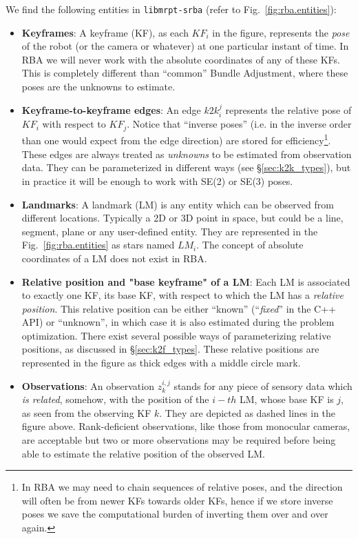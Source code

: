 \documentclass[a4paper,11pt]{article}
\begin{document}
We find the following entities in \texttt{libmrpt-srba} (refer to Fig.~\ref{fig:rba.entities}):

\begin{itemize}
\item{\textbf{Keyframes}: A keyframe (KF), as each $KF_i$ in the figure, represents the \emph{pose} of the robot (or the 
camera or whatever) at one  particular instant of time. In RBA we will never work with the absolute coordinates of any of 
these KFs. This is completely different than ``common'' Bundle Adjustment, where these poses are the unknowns to 
estimate.
}
\item{\textbf{Keyframe-to-keyframe edges}: An edge $k2k_i^j$ represents the relative pose of $KF_i$ with respect to 
$KF_j$. Notice that ``inverse poses'' (i.e. in the inverse order than one would expect from the edge direction) are 
stored for efficiency\footnote{In RBA we may need to chain sequences of relative poses, and the direction will often 
be from newer KFs towards older KFs, hence if we store inverse poses we save the computational burden of inverting them 
over and over again.}. These edges are always treated as \emph{unknowns} to be estimated from observation data.
They can be parameterized in different ways (see \S\ref{sec:k2k_types}), but in practice it will be enough to work 
with SE(2) or SE(3) poses.
}
\item{\textbf{Landmarks}: A landmark (LM) is any entity which can be observed from different locations. Typically a 2D 
or 3D point in space, but could be a line, segment, plane or any user-defined entity. They are represented in 
the Fig.~\ref{fig:rba.entities} as stars named $LM_i$. The concept of absolute coordinates of a LM 
does not exist in RBA.
}
\item{\textbf{Relative position and "base keyframe" of a LM}: Each LM is associated to exactly one KF, its {base KF}, with 
respect to which the LM has a \emph{relative position}. This relative position can be either ``known'' (``\emph{fixed}'' 
in the C++ API) or ``unknown'', in which case it is also estimated during the problem optimization. There exist several 
possible ways of parameterizing relative positions, as discussed in \S\ref{sec:k2f_types}. These relative positions are 
represented in the figure as thick edges with a middle circle mark.
}
\item{\textbf{Observations}: An observation $z^{i,j}_k$ stands for any piece of sensory data which \emph{is related}, 
somehow, with the position of the $i-th$ LM, whose base KF is $j$, as seen from the observing KF $k$. They are 
depicted as dashed lines in the figure above. Rank-deficient observations, like those from monocular cameras, are 
acceptable but two or more observations may be required before being able to estimate the relative position of the 
observed LM.
}
\end{itemize}
\end{document}
